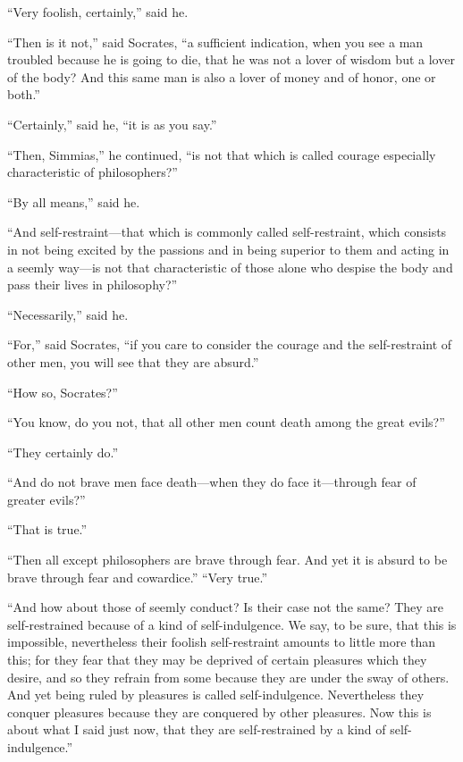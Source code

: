 \documentclass[letterpaper,12pt]{article}
\newcommand{\stephpag}[1]{\marginnote{\small\itshape\fontfamily{ppl}\selectfont #1}}
\begin{document}
\begin{drama}
``Very foolish, certainly,'' said he.
 
``Then is it not,'' said Socrates, ``a sufficient indication, when you see a man troubled because he is going to die, that he was not a lover of wisdom but a lover of the body? \stephpag{c} And this same man is also a lover of money and of honor, one or both.''
 
``Certainly,'' said he, ``it is as you say.''
 
``Then, Simmias,'' he continued, ``is not that which is called courage especially characteristic of philosophers?''
 
``By all means,'' said he.
 
``And self-restraint---that which is commonly called self-restraint, which consists in not being excited by the passions and in being superior to them and acting in a seemly way---is not that characteristic of those alone who despise the body \stephpag{d} and pass their lives in philosophy?''
 
``Necessarily,'' said he.
 
``For,'' said Socrates, ``if you care to consider the courage and the self-restraint of other men, you will see that they are absurd.''
 
``How so, Socrates?''
 
``You know, do you not, that all other men count death among the great evils?''
 
``They certainly do.''
 
``And do not brave men face death---when they do face it---through fear of greater evils?''
 
``That is true.''
 
``Then all except philosophers are brave through fear. And yet it is absurd to be brave through fear and cowardice.'' \stephpag{e} ``Very true.''
 
``And how about those of seemly conduct? Is their case not the same? They are self-restrained because of a kind of self-indulgence. We say, to be sure, that this is impossible, nevertheless their foolish self-restraint amounts to little more than this; for they fear that they may be deprived of certain pleasures which they desire, and so they refrain from some because they are under the sway of others. And yet being ruled by pleasures \stephpag{69 a} is called self-indulgence. Nevertheless they conquer pleasures because they are conquered by other pleasures. Now this is about what I said just now, that they are self-restrained by a kind of self-indulgence.''
 

\end{drama}
\end{document}
